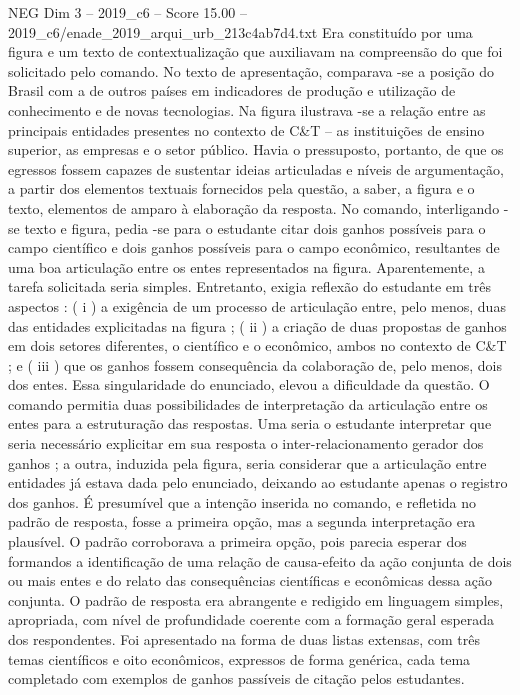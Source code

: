 \begin{textsample}{NEG Dim 3 – 2019\_c6 – Score 15.00 – 2019\_c6/enade\_2019\_arqui\_urb\_213c4ab7d4.txt}
Era constituído por uma figura e um texto de contextualização que auxiliavam na compreensão do que foi solicitado pelo comando.
No texto de apresentação, comparava -se a posição do Brasil com a de outros países em indicadores de produção e utilização de conhecimento e de novas tecnologias.
Na figura ilustrava -se a relação entre as principais entidades presentes no contexto de C\&T – as instituições de ensino superior, as empresas e o setor público.
Havia o pressuposto, portanto, de que os egressos fossem capazes de sustentar ideias articuladas e níveis de argumentação, a partir dos elementos textuais fornecidos pela questão, a saber, a figura e o texto, elementos de amparo à elaboração da resposta.
No comando, interligando -se texto e figura, pedia -se para o estudante citar dois ganhos possíveis para o campo científico e dois ganhos possíveis para o campo econômico, resultantes de uma boa articulação entre os entes representados na figura.
Aparentemente, a tarefa solicitada seria simples.
Entretanto, exigia reflexão do estudante em três aspectos : ( i ) a exigência de um processo de articulação entre, pelo menos, duas das entidades explicitadas na figura ; ( ii ) a criação de duas propostas de ganhos em dois setores diferentes, o científico e o econômico, ambos no contexto de C\&T ; e ( iii ) que os ganhos fossem consequência da colaboração de, pelo menos, dois dos entes.
Essa singularidade do enunciado, elevou a dificuldade da questão.
O comando permitia duas possibilidades de interpretação da articulação entre os entes para a estruturação das respostas.
Uma seria o estudante interpretar que seria necessário explicitar em sua resposta o inter-relacionamento gerador dos ganhos ; a outra, induzida pela figura, seria considerar que a articulação entre entidades já estava dada pelo enunciado, deixando ao estudante apenas o registro dos ganhos.
É presumível que a intenção inserida no comando, e refletida no padrão de resposta, fosse a primeira opção, mas a segunda interpretação era plausível.
O padrão corroborava a primeira opção, pois parecia esperar dos formandos a identificação de uma relação de causa-efeito da ação conjunta de dois ou mais entes e do relato das consequências científicas e econômicas dessa ação conjunta.
O padrão de resposta era abrangente e redigido em linguagem simples, apropriada, com nível de profundidade coerente com a formação geral esperada dos respondentes.
Foi apresentado na forma de duas listas extensas, com três temas científicos e oito econômicos, expressos de forma genérica, cada tema completado com exemplos de ganhos passíveis de citação pelos estudantes.

\end{textsample}
